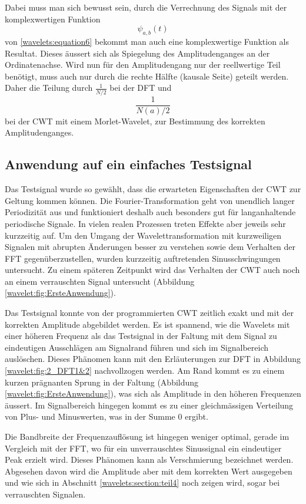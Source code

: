 Dabei muss man sich bewusst sein, durch die Verrechnung des Signals mit der komplexwertigen Funktion \[\psi_{a,b}(t)\] von \eqref{wavelets:equation6} bekommt man auch eine komplexwertige Funktion als Resultat. Dieses äussert sich als Spiegelung des Amplitudenganges an der Ordinatenachse. Wird nun für den Amplitudengang nur der reellwertige Teil benötigt, muss auch nur durch die rechte Hälfte (kausale Seite) geteilt werden. Daher die Teilung durch $\frac{1}{N/2}$ bei der DFT und \[\frac{1}{N(a)/2}\] bei der CWT mit einem Morlet-Wavelet, zur Bestimmung des korrekten Amplitudenganges.

\subsection{Anwendung auf ein einfaches Testsignal
	\label{wavelets:subsection:ErsteAnwendung}}
Das Testsignal wurde so gewählt, dass die erwarteten Eigenschaften der CWT zur Geltung kommen können. Die Fourier-Transformation geht von unendlich langer Periodizität aus und funktioniert deshalb auch besonders gut für langanhaltende periodische Signale. In vielen realen Prozessen treten Effekte aber jeweils sehr kurzzeitig auf. Um den Umgang der Wavelettransformation mit kurzweiligen Signalen mit abrupten Änderungen besser zu verstehen sowie dem Verhalten der FFT gegenüberzustellen, wurden kurzzeitig auftretenden Sinusschwingungen untersucht. Zu einem späteren Zeitpunkt wird das Verhalten der CWT auch noch an einem verrauschten Signal untersucht (Abbildung \ref{wavelet:fig:ErsteAnwendung}).

Das Testsignal konnte von der programmierten CWT zeitlich exakt und mit der korrekten Amplitude abgebildet werden. Es ist spannend, wie die Wavelets mit einer höheren Frequenz als das Testsignal in der Faltung mit dem Signal zu eindeutigen Ausschlägen am Signalrand führen und sich im Signalbereich auslöschen. Dieses Phänomen kann mit den Erläuterungen zur DFT in Abbildung \ref{wavelet:fig:2_DFT1&2} nachvollzogen werden.
Am Rand kommt es zu einem kurzen prägnanten Sprung in der Faltung (Abbildung \ref{wavelet:fig:ErsteAnwendung}), was sich als Amplitude in den höheren Frequenzen äussert. Im Signalbereich hingegen kommt es zu einer gleichmässigen Verteilung von Plus- und Minuswerten, was in der Summe $0$ ergibt.

Die Bandbreite der Frequenzauflösung ist hingegen weniger optimal, gerade im Vergleich mit der FFT, wo für ein unverrauschtes Sinussignal ein eindeutiger Peak erzielt wird.
Dieses Phänomen kann als Verschmierung bezeichnet werden. Abgesehen davon wird die Amplitude aber mit dem korrekten Wert ausgegeben und wie sich in Abschnitt \ref{wavelets:section:teil4} noch zeigen wird, sogar bei verrauschten Signalen.

